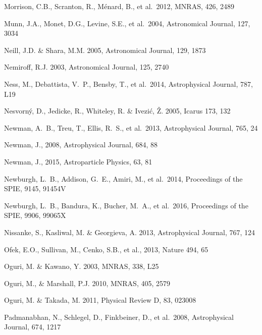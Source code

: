 \documentclass[twocolumn]{aastex61}
\begin{document}
\begin{thebibliography}{}
 Morrison, C.B., Scranton, R., M\'{e}nard, B., et al.~2012, MNRAS, 426, 2489

 Munn, J.A., Monet, D.G., Levine, S.E., et al.~2004, Astronomical Journal, 127, 3034

 Neill, J.D. \& Shara, M.M. 2005, Astronomical Journal, 129, 1873

 Nemiroff, R.J. 2003, Astronomical Journal, 125, 2740

 Ness, M., Debattista, V.~P., Bensby, T., et al.~2014, Astrophysical Journal, 787, L19

 Nesvorn\'{y}, D., Jedicke, R., Whiteley, R. \& Ivezi\'{c}, \v{Z}. 2005, Icarus 173, 132

 Newman, A.~B., Treu, T., Ellis, R.~S., et al.\ 2013, Astrophysical Journal, 765, 24

 Newman, J., 2008, Astrophysical Journal, 684, 88

 Newman, J., 2015, Astroparticle Physics, 63, 81

 Newburgh, L.~B., Addison, G.~E., Amiri, M., et al.~2014, Proceedings of the SPIE, 9145, 91454V

 Newburgh, L.~B., Bandura, K., Bucher, M.~A., et al.~2016, Proceedings of the SPIE, 9906, 99065X

 Nissanke, S., Kasliwal, M. \& Georgieva, A. 2013,  Astrophysical Journal, 767, 124

 Ofek, E.O.,  Sullivan, M., Cenko, S.B., et al., 2013, Nature 494, 65

 Oguri, M. \& Kawano, Y. 2003, MNRAS, 338, L25

 Oguri, M., \& Marshall, P.J. 2010, MNRAS, 405, 2579

 Oguri, M. \& Takada, M. 2011, Physical Review D, 83, 023008

 Padmanabhan, N., Schlegel, D., Finkbeiner, D., et al.~2008, Astrophysical Journal, 674, 1217


\end{thebibliography}
\end{document}
